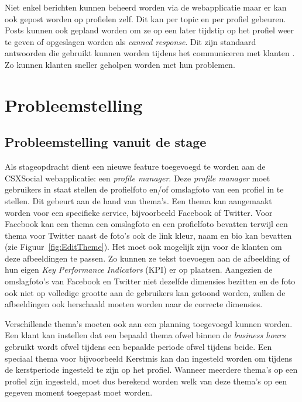 Niet enkel berichten kunnen beheerd worden via de webapplicatie maar er kan ook gepost worden op profielen zelf. Dit kan per topic en per profiel gebeuren. Posts kunnen ook gepland worden om ze op een later tijdstip op het profiel weer te geven  of opgeslagen worden als \textit{canned response}. Dit zijn standaard antwoorden die gebruikt kunnen worden tijdens het communiceren met klanten \cite{EngagorApp}. Zo kunnen klanten sneller geholpen worden met hun problemen.
 
\chapter{Probleemstelling}
\vspace{-3cm}
\section{Probleemstelling vanuit de stage}

Als stageopdracht dient een nieuwe feature toegevoegd te worden aan de CSXSocial webapplicatie: een \textit{profile manager}. Deze \textit{profile manager} moet gebruikers in staat stellen de profielfoto en/of omslagfoto van een profiel in te stellen. Dit gebeurt aan de hand van thema's. Een thema kan aangemaakt worden voor een specifieke service, bijvoorbeeld Facebook of Twitter. Voor Facebook kan een thema een omslagfoto en een profielfoto bevatten terwijl een thema voor Twitter naast de foto's ook de link kleur, naam en bio kan bevatten (zie Figuur~\ref{fig:EditTheme}). Het moet ook mogelijk zijn voor de klanten om deze afbeeldingen te passen. Zo kunnen ze tekst toevoegen aan de afbeelding of hun eigen \textit{Key Performance Indicators} (KPI) er op plaatsen. Aangezien de omslagfoto's van Facebook en Twitter niet dezelfde dimensies bezitten en de foto ook niet op volledige grootte aan de gebruikers kan getoond worden, zullen de afbeeldingen ook herschaald moeten worden naar de correcte dimensies.

Verschillende thema's moeten ook aan een planning toegevoegd kunnen worden. Een klant kan instellen dat een bepaald thema ofwel binnen de \textit{business hours} gebruikt wordt ofwel tijdens een bepaalde periode ofwel tijdens beide. Een speciaal thema voor bijvoorbeeld Kerstmis kan dan ingesteld worden om tijdens de kerstperiode ingesteld te zijn op het profiel. Wanneer meerdere thema's op een profiel zijn ingesteld, moet dus berekend worden welk van deze thema's op een gegeven moment toegepast moet worden. 

